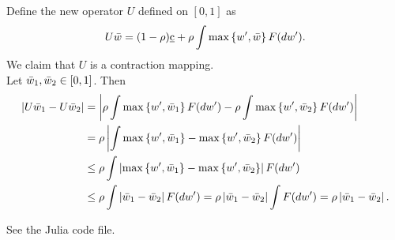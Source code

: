\documentclass[12pt]{article}
\begin{document}
\begin{sol}[4.2. Conti]
    Define the new operator $U$ defined on $[0,1]$ as 
    \begin{equation*}
        U\Bar{w} = (1-\rho)\underbar{c} + \rho \int \max\left\{ {w', \Bar{w}} \right\} F(dw').
    \end{equation*}
    We claim that $U$ is a contraction mapping. \\
    Let $\Bar{w}_1, \Bar{w}_2\in[0,1]$. Then 
    \begin{equation*}
        \begin{aligned}
            \left\lvert {U\Bar{w}_1 - U\Bar{w}_2} \right\rvert 
            &= \left\lvert {\rho \int \max\left\{ {w', \Bar{w}_1} \right\} F(dw') - \rho \int \max\left\{ {w', \Bar{w}_2} \right\} F(dw')} \right\rvert\\
            &= \rho\left\lvert {\int \max\left\{ {w', \Bar{w}_1} \right\}-\max\left\{ {w', \Bar{w}_2} \right\} F(dw')} \right\rvert\\
            &\leq \rho \int\left\lvert {\max\left\{ {w', \Bar{w}_1} \right\}-\max\left\{ {w', \Bar{w}_2} \right\}} \right\rvert F(dw')\\
            &\leq \rho \int\left\lvert {\Bar{w}_1-\Bar{w}_2} \right\rvert F(dw') = \rho \left\lvert {\Bar{w}_1-\Bar{w}_2} \right\rvert\int F(dw') = \rho \left\lvert {\Bar{w}_1-\Bar{w}_2} \right\rvert.
        \end{aligned}
    \end{equation*}
    \solend
\end{sol}
\begin{sol}[4.3, 4.4, 4.5, 4.6]
    See the Julia code file.
    \solend 
\end{sol}
\end{document}
